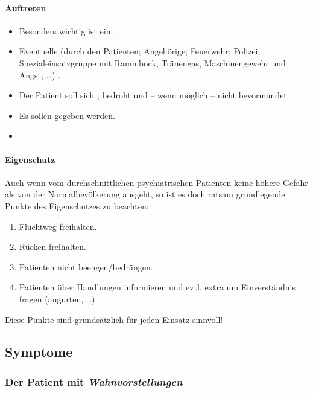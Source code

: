 \paragraph{Auftreten} 

\begin{itemize}
    \item Besonders wichtig ist ein .
    \item  Eventuelle  (durch den
    Patienten; Angehörige; Feuerwehr; Polizei;
    Spezialeinsatzgruppe mit Rammbock, Tränengas,
    Maschinengewehr und Angst; \ldots) .
    \item Der Patient soll sich ,
    bedroht und -- wenn möglich -- nicht bevormundet
    .
    \item Es sollen  gegeben werden.
   \item {}
\end{itemize}

\paragraph{Eigenschutz} Auch wenn vom durchschnittlichen
psychiatrischen Patienten keine höhere Gefahr als von der
Normalbevölkerung ausgeht, so ist es doch ratsam
grundlegende Punkte des Eigenschutzes zu beachten:

\begin{enumerate}
    \item Fluchtweg freihalten.
    \item Rücken freihalten. 
    \item Patienten nicht beengen/bedrängen.
    \item Patienten über Handlungen informieren und evtl.
    extra um Einverständnis fragen (angurten, \ldots).
\end{enumerate}


Diese Punkte sind grundsätzlich für jeden Einsatz sinnvoll!



\subsection{Symptome}

\subsubsection{Der Patient mit \emph{Wahnvorstellungen}}

